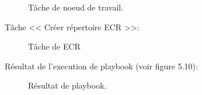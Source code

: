 {\begin{figure}[H]
                       \caption{Tâche de noeud de travail.}
                      \end{figure}
                      \indent
                       Tâche << Créer répertoire ECR >>:
                       \begin{figure}[H]
                         \begin{center}
                         \end{center}
                         \caption{Tâche de ECR}
                        \end{figure}
                        \indent
                         Résultat de l'execution de playbook (voir figure 5.10):
                         \begin{figure}[H]
                           \begin{center}
                           \end{center}
                           \caption{Résultat de playbook.}
                          \end{figure}
                          }   

